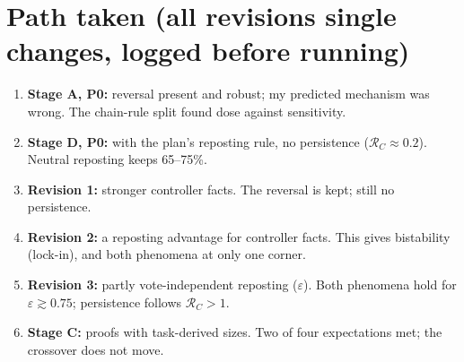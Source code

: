 \documentclass[10pt,a4paper]{article}
\begin{document}
\section{Path taken (all revisions single changes, logged before running)}
\begin{enumerate}
\item \textbf{Stage A, P0:} reversal present and robust; my predicted mechanism was wrong. The chain-rule split found
  dose against sensitivity.
\item \textbf{Stage D, P0:} with the plan's reposting rule, no persistence ($\mathcal R_C\approx0.2$). Neutral
  reposting keeps 65--75\%.
\item \textbf{Revision 1:} stronger controller facts. The reversal is kept; still no persistence.
\item \textbf{Revision 2:} a reposting advantage for controller facts. This gives bistability (lock-in), and both
  phenomena at only one corner.
\item \textbf{Revision 3:} partly vote-independent reposting ($\varepsilon$). Both phenomena hold for
  $\varepsilon\gtrsim0.75$; persistence follows $\mathcal R_C>1$.
\item \textbf{Stage C:} proofs with task-derived sizes. Two of four expectations met; the crossover does not move.
\end{enumerate}
\end{document}
